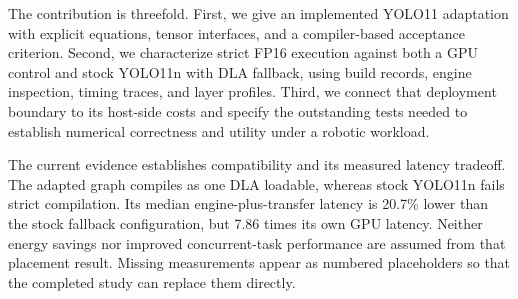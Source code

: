 The contribution is threefold. First, we give an implemented YOLO11 adaptation
with explicit equations, tensor interfaces, and a compiler-based acceptance
criterion. Second, we characterize strict FP16 execution against both a GPU
control and stock YOLO11n with DLA fallback, using build records, engine
inspection, timing traces, and layer profiles. Third, we connect that deployment
boundary to its host-side costs and specify the outstanding tests needed to
establish numerical correctness and utility under a robotic workload.

The current evidence establishes compatibility and its measured latency tradeoff.
The adapted graph compiles as one DLA loadable, whereas stock YOLO11n fails
strict compilation. Its median engine-plus-transfer latency is 20.7\% lower
than the stock fallback configuration, but 7.86 times its own GPU latency.
Neither energy savings nor improved concurrent-task performance are assumed
from that placement result. Missing measurements appear as numbered
placeholders so that the completed study can replace them directly.
